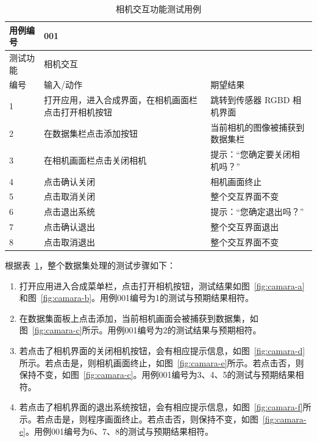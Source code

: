 \begin{table}[thbp]
  \centering
  \small{}\setlength{}
  \caption{相机交互功能测试用例}
  \begin{tabular}{|p{2cm}<{\centering}|p{4cm}<{\centering}|p{4cm}<{\centering}|}
    \hline
    用例编号 & \multicolumn{2}{|l|}{001}       \\
    \hline
    测试功能 & \multicolumn{2}{|l|}{相机交互}       \\
    \hline
    编号 & 输入/动作 & 期望结果 \\
    \hline
    1 & 打开应用，进入合成界面，在相机画面栏点击打开相机按钮 & 跳转到传感器 RGBD 相机界面 \\
    \hline
    2 & 在数据集栏点击添加按钮 & 当前相机的图像被捕获到数据集栏 \\
    \hline
    3 & 在相机画面栏点击关闭相机 & 提示：“您确定要关闭相机吗？” \\
    \hline
    4 & 点击确认关闭 & 相机画面终止 \\
    \hline
    5 & 点击取消关闭 & 整个交互界面不变 \\
    \hline
    6 & 点击退出系统 & 提示：“您确定退出吗？” \\
    \hline
    7 & 点击确认退出 & 整个交互界面退出 \\
    \hline
    8 & 点击取消退出 & 整个交互界面不变 \\
    \hline
  \end{tabular}
  \label{tab:camera}
\end{table}
根据表~\ref{tab:camera}，整个数据集处理的测试步骤如下：
\begin{enumerate}
    \item[1)] 打开应用进入合成菜单栏，点击打开相机按钮，测试结果如图~\ref{fig:camara-a}和图~\ref{fig:camara-b}。用例001编号为1的测试与预期结果相符。
    \item[2)] 在数据集面板上点击添加，当前相机画面会被捕获到数据集，如图~\ref{fig:camara-c}所示。用例001编号为2的测试结果与预期相符。
    \item[3)] 若点击了相机界面的关闭相机按钮，会有相应提示信息，如图~\ref{fig:camara-d}所示。若点击是，则相机画面终止，如图~\ref{fig:camara-e}所示。若点击否，则保持不变，如图~\ref{fig:camara-c}。用例001编号为3、4、5的测试与预期结果相符。
    \item[4)] 若点击了相机界面的退出系统按钮，会有相应提示信息，如图~\ref{fig:camara-f}所示。若点击是，则程序画面终止。若点击否，则保持不变，如图~\ref{fig:camara-e}。用例001编号为6、7、8的测试与预期结果相符。
\end{enumerate}

